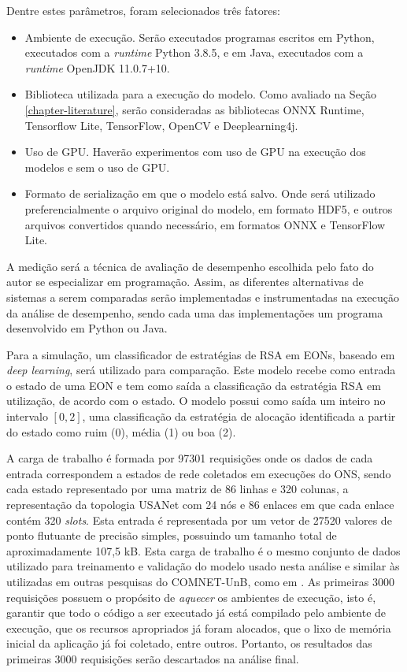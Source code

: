 Dentre estes parâmetros, foram selecionados três fatores:

\begin{itemize}
    \item Ambiente de execução. Serão executados programas escritos em Python, executados com a \textit{runtime} Python 3.8.5, e em Java, executados com a \textit{runtime} OpenJDK 11.0.7+10.
    \item Biblioteca utilizada para a execução do modelo. Como avaliado na Seção \ref{chapter-literature}, serão consideradas as bibliotecas ONNX Runtime, Tensorflow Lite, TensorFlow, OpenCV e Deeplearning4j.
    \item Uso de GPU. Haverão experimentos com uso de GPU na execução dos modelos e sem o uso de GPU.
    \item Formato de serialização em que o modelo está salvo. Onde será utilizado preferencialmente o arquivo original do modelo, em formato HDF5, e outros arquivos convertidos quando necessário, em formatos ONNX e TensorFlow Lite.
\end{itemize}

A medição será a técnica de avaliação de desempenho escolhida pelo fato do autor se especializar em programação. Assim, as diferentes alternativas de sistemas a serem comparadas serão implementadas e instrumentadas na execução da análise de desempenho, sendo cada uma das implementações um programa desenvolvido em Python ou Java.

Para a simulação, um classificador de estratégias de RSA em EONs, baseado em \textit{deep learning}, será utilizado para comparação. Este modelo recebe como entrada o estado de uma EON e tem como saída a classificação da estratégia RSA em utilização, de acordo com o estado. O modelo possui como saída um inteiro no intervalo $[0, 2]$, uma classificação da estratégia de alocação identificada a partir do estado como ruim (0), média (1) ou boa (2).

A carga de trabalho é formada por 97301 requisições onde os dados de cada entrada correspondem a estados de rede coletados em execuções do ONS, sendo cada estado representado por uma matriz de 86 linhas e 320 colunas, a representação da topologia USANet com 24 nós e 86 enlaces em que cada enlace contém 320 \textit{slots}. Esta entrada é representada por um vetor de 27520 valores de ponto flutuante de precisão simples, possuindo um tamanho total de aproximadamente 107,5 kB. Esta carga de trabalho é o mesmo conjunto de dados utilizado para treinamento e validação do modelo usado nesta análise e similar às utilizadas em outras pesquisas do \acrfull{COMNET-UnB}, como em \cite{eon_ml_classifier_2020}. As primeiras 3000 requisições possuem o propósito de \textit{aquecer} os ambientes de execução, isto é, garantir que todo o código a ser executado já está compilado pelo ambiente de execução, que os recursos apropriados já foram alocados, que o lixo de memória inicial da aplicação já foi coletado, entre outros. Portanto, os resultados das primeiras 3000 requisições serão descartados na análise final.

